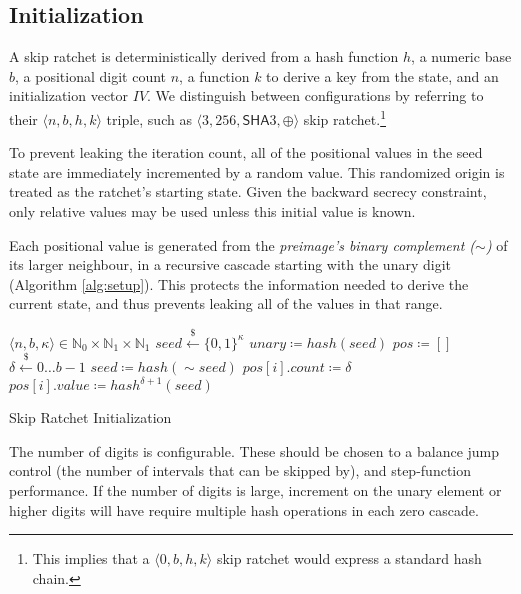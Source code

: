 \documentclass[twocolumn]{article}
\begin{document}
	\subsection{Initialization}
	
	A skip ratchet is deterministically derived from a hash function $h$, a numeric base $b$, a positional digit count $n$, a function $k$ to derive a key from the state, and an initialization vector $IV$. We distinguish between configurations by referring to their $\langle n, b, h, k \rangle$ triple, such as $\langle 3, 256, \textsf{SHA}3, \oplus \rangle$ skip ratchet.\footnote{This implies that a $\langle 0, b, h, k \rangle$ skip ratchet would express a standard hash chain.}
	
	To prevent leaking the iteration count, all of the positional values in the seed state are immediately incremented by a random value. This randomized origin is treated as the ratchet's starting state. Given the backward secrecy constraint, only relative values may be used unless this initial value is known.
	
	Each positional value is generated from the \emph{preimage's binary complement ($\sim$)} of its larger neighbour, in a recursive cascade starting with the unary digit (Algorithm \ref{alg:setup}). This protects the information needed to derive the current state, and thus prevents leaking all of the values in that range.
		
	\begin{algorithm*}
		\begin{algorithmic}[1]
			\Require $\langle n, b, \kappa \rangle \in \mathbb{N}_{0}\times{\mathbb{N}_{1}\times{\mathbb{N}_{1}}}$ 
			\State $seed \overset{\$}{\gets} \lbrace 0, 1 \rbrace^{\kappa}$
			\State $unary \coloneqq hash(seed)$
			\State $pos   \coloneqq []$
			 
				\State $\delta \overset{\$}{\gets} 0\ldots{b - 1}$ 
				\State $seed \coloneqq hash(\sim{seed})$ 
				\State $pos[i].count \coloneqq \delta$
				\State $pos[i].value \coloneqq hash^{\delta + 1}(seed)$
			\EndFor
			\\
		\end{algorithmic}
	
		\caption{Skip Ratchet Initialization}
		\label{alg:setup}
	\end{algorithm*}

	The number of digits is configurable. These should be chosen to a balance jump control (the number of intervals that can be skipped by), and step-function performance. If the number of digits is large, increment on the unary element or higher digits will have require multiple hash operations in each zero cascade.
	
\end{document}

